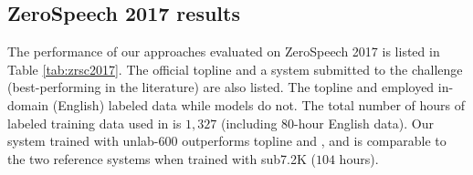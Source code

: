 \documentclass[a4paper]{article}
\begin{document}
\subsection{ZeroSpeech 2017 results}
\begin{table}[!t]
\renewcommand\arraystretch{0.80}
\centering
\caption{ABX error rate of  BNFs  on ZeroSpeech 2017 English sets. Models are trained with  Libri-light using Dutch labels.}
\label{tab:zrsc2017}
\end{table}
The performance of our approaches evaluated on ZeroSpeech 2017 is listed in Table \ref{tab:zrsc2017}. The official topline \cite{dunbar2017zero}  and a system submitted to the challenge (best-performing in the literature) \cite{shibata2017composite} are also listed. The topline and \cite{shibata2017composite}  employed in-domain (English) labeled data while models do not. The total number of hours of labeled training data used in \cite{shibata2017composite} is $1,327$ (including $80$-hour English data).
Our system trained with unlab-600 outperforms topline and \cite{shibata2017composite}, and is comparable to the two reference systems when trained with sub7.2K ($104$ hours).
\end{document}
